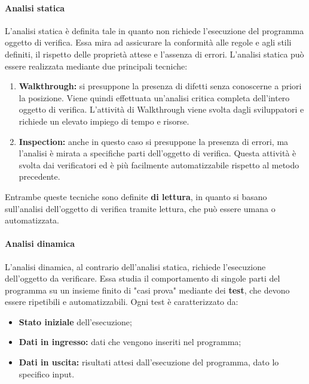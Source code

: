 \documentclass[a4paper,12pt]{article}
\begin{document}
            \paragraph{Analisi statica}\hfill\break
                L'analisi statica è definita tale in quanto non richiede l'esecuzione del programma oggetto di verifica. Essa mira ad assicurare la conformità alle regole e agli stili definiti, il rispetto delle proprietà attese e l'assenza di errori.\newline
                L'analisi statica può essere realizzata mediante due principali tecniche:
                \begin{enumerate}
                    \item \textbf{Walkthrough:} si presuppone la presenza di difetti senza conoscerne a priori la posizione. Viene quindi effettuata un'analisi critica completa dell'intero oggetto di verifica. L'attività di Walkthrough viene svolta dagli sviluppatori e richiede un elevato impiego di tempo e risorse.
                    \item \textbf{Inspection:} anche in questo caso si presuppone la presenza di errori, ma l'analisi è mirata a specifiche parti dell'oggetto di verifica. Questa attività è svolta dai verificatori ed è più facilmente automatizzabile rispetto al metodo precedente.
                \end{enumerate}
                Entrambe queste tecniche sono definite \textbf{di lettura}, in quanto si basano sull'analisi dell'oggetto di verifica tramite lettura, che può essere umana o automatizzata.

            \paragraph{Analisi dinamica}\hfill\break
                L'analisi dinamica, al contrario dell'analisi statica, richiede l'esecuzione dell'oggetto da verificare. Essa studia il comportamento di singole parti del programma su un insieme finito di "casi prova" mediante dei \textbf{test}, che devono essere ripetibili e automatizzabili.\newline
                Ogni test è caratterizzato da:
                \begin{itemize}
                    \item \textbf{Stato iniziale} dell'esecuzione;
                    \item \textbf{Dati in ingresso:} dati che vengono inseriti nel programma;
                    \item \textbf{Dati in uscita:} risultati attesi dall'esecuzione del programma, dato lo specifico input.
                \end{itemize}
\end{document}
